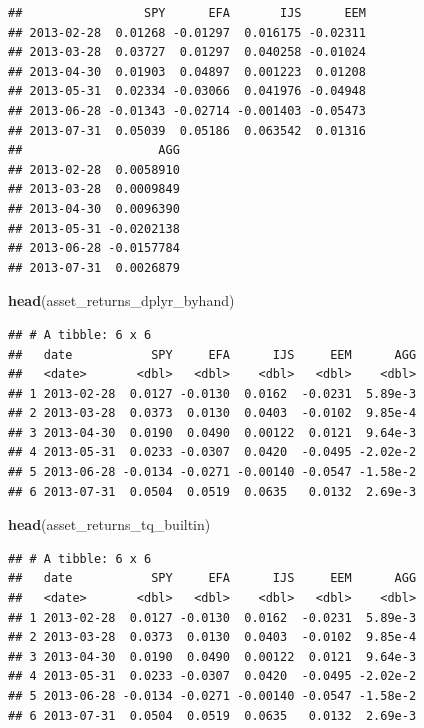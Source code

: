 \documentclass[]{krantz}
\makeatletter
\newenvironment{Shaded}{\begin{snugshade}}{\end{snugshade}}
\newcommand{\KeywordTok}[1]{\textcolor[rgb]{0.13,0.29,0.53}{\textbf{#1}}}
\newcommand{\NormalTok}[1]{#1}
\newenvironment{kframe}{%
\medskip{}
\setlength{\fboxsep}{.8em}
 \def\at@end@of@kframe{}%
 \ifinner\ifhmode%
  \def\at@end@of@kframe{\end{minipage}}%
  \begin{minipage}{\columnwidth}%
 \fi\fi%
 \def\FrameCommand##1{\hskip\@totalleftmargin \hskip-\fboxsep
 \colorbox{shadecolor}{##1}\hskip-\fboxsep
     \hskip-\linewidth \hskip-\@totalleftmargin \hskip\columnwidth}%
 \MakeFramed {\advance\hsize-\width
   \@totalleftmargin\z@ \linewidth\hsize
   \@setminipage}}%
 {\par\unskip\endMakeFramed%
 \at@end@of@kframe}
\renewenvironment{Shaded}{\begin{kframe}}{\end{kframe}}
\makeatother
\begin{document}
\begin{verbatim}
##                 SPY      EFA       IJS      EEM
## 2013-02-28  0.01268 -0.01297  0.016175 -0.02311
## 2013-03-28  0.03727  0.01297  0.040258 -0.01024
## 2013-04-30  0.01903  0.04897  0.001223  0.01208
## 2013-05-31  0.02334 -0.03066  0.041976 -0.04948
## 2013-06-28 -0.01343 -0.02714 -0.001403 -0.05473
## 2013-07-31  0.05039  0.05186  0.063542  0.01316
##                   AGG
## 2013-02-28  0.0058910
## 2013-03-28  0.0009849
## 2013-04-30  0.0096390
## 2013-05-31 -0.0202138
## 2013-06-28 -0.0157784
## 2013-07-31  0.0026879
\end{verbatim}

\begin{Shaded}
\begin{Highlighting}[]
\KeywordTok{head}\NormalTok{(asset_returns_dplyr_byhand)}
\end{Highlighting}
\end{Shaded}

\begin{verbatim}
## # A tibble: 6 x 6
##   date           SPY     EFA      IJS     EEM      AGG
##   <date>       <dbl>   <dbl>    <dbl>   <dbl>    <dbl>
## 1 2013-02-28  0.0127 -0.0130  0.0162  -0.0231  5.89e-3
## 2 2013-03-28  0.0373  0.0130  0.0403  -0.0102  9.85e-4
## 3 2013-04-30  0.0190  0.0490  0.00122  0.0121  9.64e-3
## 4 2013-05-31  0.0233 -0.0307  0.0420  -0.0495 -2.02e-2
## 5 2013-06-28 -0.0134 -0.0271 -0.00140 -0.0547 -1.58e-2
## 6 2013-07-31  0.0504  0.0519  0.0635   0.0132  2.69e-3
\end{verbatim}

\begin{Shaded}
\begin{Highlighting}[]
\KeywordTok{head}\NormalTok{(asset_returns_tq_builtin)}
\end{Highlighting}
\end{Shaded}

\begin{verbatim}
## # A tibble: 6 x 6
##   date           SPY     EFA      IJS     EEM      AGG
##   <date>       <dbl>   <dbl>    <dbl>   <dbl>    <dbl>
## 1 2013-02-28  0.0127 -0.0130  0.0162  -0.0231  5.89e-3
## 2 2013-03-28  0.0373  0.0130  0.0403  -0.0102  9.85e-4
## 3 2013-04-30  0.0190  0.0490  0.00122  0.0121  9.64e-3
## 4 2013-05-31  0.0233 -0.0307  0.0420  -0.0495 -2.02e-2
## 5 2013-06-28 -0.0134 -0.0271 -0.00140 -0.0547 -1.58e-2
## 6 2013-07-31  0.0504  0.0519  0.0635   0.0132  2.69e-3
\end{verbatim}
\end{document}
